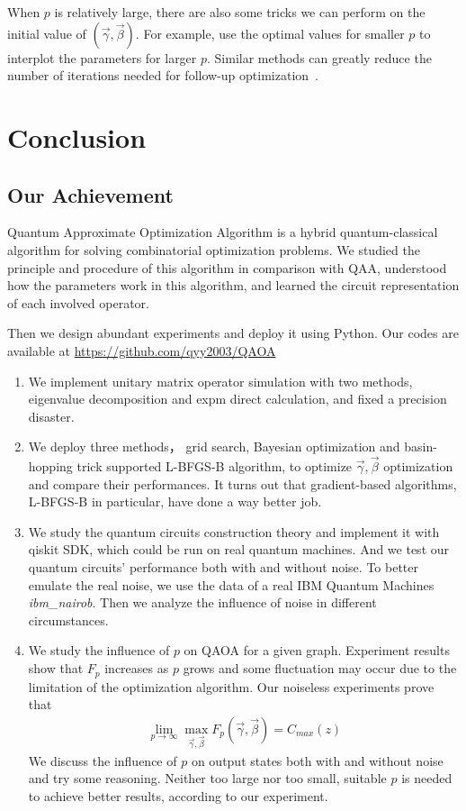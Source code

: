 \documentclass{./source/Report}
\begin{document}
When $p$ is relatively large, there are also some tricks we can perform on the initial value of 
$(\vec{\gamma}, \vec{\beta})$. For example, use the optimal values for smaller $p$ to interplot the parameters for larger $p$.
Similar methods can greatly reduce the number of iterations needed for follow-up optimization~\cite{Zhou_2020}.




\section{Conclusion}

\subsection{Our Achievement}
Quantum Approximate Optimization Algorithm is a hybrid quantum-classical algorithm for solving combinatorial optimization problems. We studied the principle and procedure of this algorithm in comparison with QAA, understood how the parameters work in this algorithm, and learned the circuit representation of each involved operator.

Then we design abundant experiments and deploy it using Python. Our codes are available at  \href{https://github.com/qyy2003/QAOA}{https://github.com/qyy2003/QAOA}

\begin{enumerate}
    \item We implement unitary matrix operator simulation with two methods, eigenvalue decomposition and expm direct calculation, and fixed a precision disaster.
    \item We deploy three methods， grid search, Bayesian optimization and  basin-hopping trick supported L-BFGS-B algorithm, to optimize $\vec{\gamma}, \vec{\beta}$ optimization and compare their performances. It turns out that gradient-based algorithms,  L-BFGS-B in particular, have done a way better job.
    \item We study the quantum circuits construction theory and implement it with qiskit SDK, which could be run on real quantum machines. And we test our quantum circuits' performance both with and without noise. To better emulate the real noise, we use the data of a real IBM  Quantum Machines \textit{ibm\_nairob}. Then we analyze the influence of noise in different circumstances.
    \item  We study the influence of $p$ on QAOA for a given graph. Experiment results show that $F_p$ increases as $p$ grows and some fluctuation may occur due to the limitation of the optimization algorithm. Our noiseless experiments prove that
    \begin{align*}
    \lim_{p\rightarrow \infty}\max_{\vec{\gamma}, \vec{\beta}}{F_p(\vec{\gamma}, \vec{\beta})}=C_{max}(z)
    \end{align*}
    We discuss the influence of $p$ on output states both with and without noise and try some reasoning. 
    Neither too large nor too small, suitable $p$ is needed to achieve better results, according to our experiment.
\end{enumerate}
\end{document}
